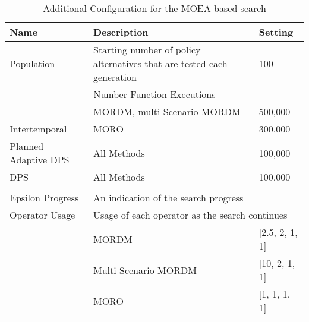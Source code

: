     \begin{table}[ht]
    \caption{Additional Configuration for the MOEA-based search}
    \label{table:moeaadditional}
    
    \setlength\arrayrulewidth{1pt}
    \begin{tabularx}{\textwidth}{|l|X|l|}
        \rowcolor{tudelft-dark-blue!80}
        \color{white}\bfseries Name          &
        \color{white}\bfseries Description   &
        \color{white}\bfseries Setting
        \\  \hline
        
        Population     & Starting number of policy alternatives that are tested each generation   & 100 \\ \hline
        
        \multicolumn{3}{|c|}{\cellcolor{tudelft-dark-blue!50}\color{white}Number Function Executions} \\ \hline
                                             & MORDM, multi-Scenario MORDM       & 500,000  \\ \cline{2-3} 
        \multirow{-2}{*}{Intertemporal}      & MORO                              & 300,000  \\ \hline
        Planned Adaptive DPS                 & All Methods                       & 100,000  \\ \hline
        DPS                                  & All Methods                       & 100,000  \\ \hline
        
        \multicolumn{3}{|c|}{\cellcolor{tudelft-dark-blue!50}{\color{white} Convergences}}  \\ \hline
        Epsilon Progress        & \multicolumn{2}{l|}{An indication of the search progress}           \\ \hline
        Operator Usage          & \multicolumn{2}{l|}{Usage of each operator as the search continues} \\ \hline
        \cellcolor{even-row-blue}    & MORDM                      & {[}2.5, 2, 1, 1{]}          \\ \cline{2-3} 
        \cellcolor{even-row-blue}    & Multi-Scenario MORDM       & {[}10, 2, 1, 1{]}           \\ \cline{2-3} 
        \multirow{-3}{*}{\cellcolor{even-row-blue}{ Hypervolume Limits}}  & MORO   & {[}1, 1, 1, 1{]} \\ \hline
        

\end{tabularx}
\end{table}
